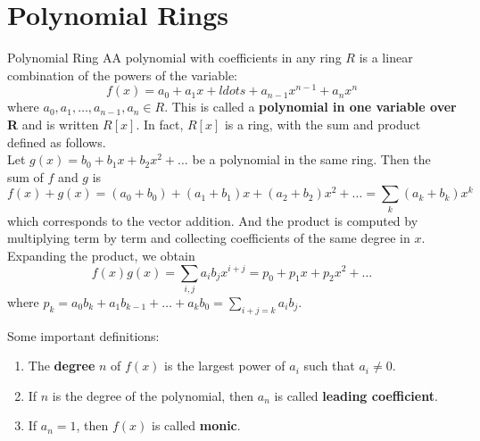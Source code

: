 \documentclass[12pt,a4paper]{article}
\begin{document}
\section{Polynomial Rings}\label{polynomial-rings}

\begin{defn}{Polynomial Ring}
AA polynomial with coefficients in any ring $R$ is a linear combination of the powers of the variable:
\[
f(x) = a_0 + a_1 x + ldots + a_{n-1} x^{n-1} + a_n x^n
\]
where $a_0, a_1, \ldots, a_{n-1}, a_n \in R$. This is called a \textbf{polynomial in one variable over R} and is written $R[x]$. In fact, $R[x]$ is a ring, with the sum and product defined as follows. \\

Let $g(x) = b_0 + b_1 x + b_2 x^2 + \ldots$ be a polynomial in the same ring. Then the sum of $f$ and $g$ is 
\[
f(x) +  g(x) = (a_0 + b_0) + (a_1 + b_1)x + (a_2 + b_2)x^2 + \ldots = \sum_k (a_k + b_k)x^k
\]
which corresponds to the vector addition. And the product is computed by multiplying term by term and collecting coefficients of the same degree in $x$. Expanding the product, we obtain
\[
f(x)g(x) = \sum_{i,j} a_i b_j x^{i+j} = p_0 + p_1 x + p_2 x^2 + \ldots
\]
where $p_k = a_0 b_k + a_1 b_{k-1} + \ldots + a_k b_0 = \sum_{i+j=k} a_i b_j$.
\end{defn}

Some important definitions:
\begin{enumerate}
\item The \textbf{degree} $n$ of $f(x)$ is the largest power of $a_i$ such that $a_i \neq 0$.  
\item If $n$ is the degree of the polynomial, then $a_n$ is called \textbf{leading coefficient}. 
\item If $a_n = 1$, then $f(x)$ is called \textbf{monic}.
\end{enumerate}
\end{document}

